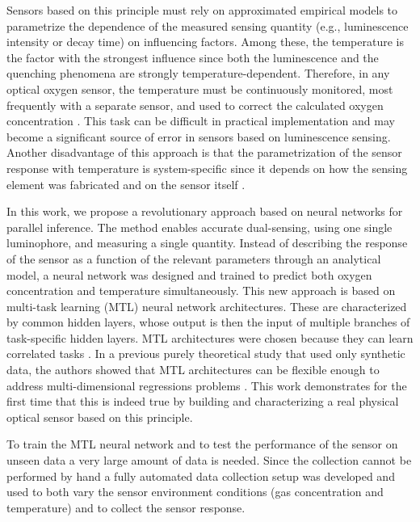 \documentclass[final,5p,times,twocolumn]{elsarticle}
\begin{document}
Sensors based on this principle must rely on approximated empirical models to parametrize the dependence of the measured sensing quantity (e.g., luminescence intensity or decay time) on influencing factors. Among these, the temperature is the factor with the strongest influence since both the luminescence and the quenching phenomena are strongly temperature-dependent. Therefore, in any optical oxygen sensor, the temperature must be continuously monitored, most frequently with a separate sensor, and used to correct the calculated oxygen concentration \cite{Li2015}. This task can be difficult in practical implementation and may become a significant source of error in sensors based on luminescence sensing. Another disadvantage of this approach is that the parametrization of the sensor response with temperature is system-specific since it depends  on how the sensing element was fabricated and on the sensor itself \cite{Xu1994,Draxler1995,Hartmann1996,Mills1998,Badocco2008,Dini2011}.

In this work, we propose a revolutionary approach based on neural networks for parallel inference. The method enables accurate dual-sensing, using one single luminophore, and measuring a single quantity.
Instead of describing the response of the sensor as a function of the relevant parameters through an analytical model, a neural network  was designed and trained to predict both oxygen concentration and temperature simultaneously.
This new approach is based on multi-task learning (MTL) neural network architectures. These are characterized by common hidden layers, whose output is then the input of multiple branches of task-specific hidden layers. MTL architectures were chosen because they can learn correlated tasks \cite{Argyriou2006, Thrun1996, Caruana1997, Zhang2017, Baxter2000, Thung2018}. In a previous purely theoretical study that used only synthetic data, the authors showed that MTL architectures can be flexible enough to address multi-dimensional regressions problems \cite{Michelucci2019_2}. This work demonstrates for the first time that this is indeed true by building and characterizing a real physical optical sensor based on this principle.

To train the MTL neural network and to test the performance of the sensor on unseen data a very large amount of data is needed. Since the collection  cannot be performed by hand a fully automated data collection setup was developed and used to both vary the sensor environment conditions (gas concentration and temperature) and to collect the sensor response. 
\end{document}
